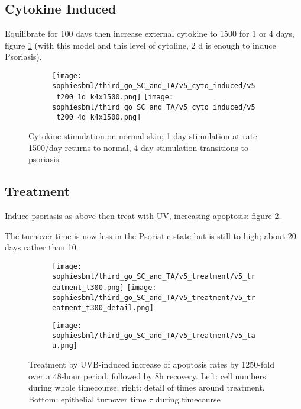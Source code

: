 \documentclass[a4paper,10pt]{report}
\newcommand{\psortbase}{/home/ngrs2/work/bsu/PSORT_Zuliani_Reynolds/}
\newcommand{\sbmlbase}{\psortbase/sbml-sh/}
\newcommand{\sophiesbml}{\sbmlbase/sophie_like}
\begin{document}
\subsection{Cytokine Induced}

Equilibrate for 100 days then increase external cytokine to 1500 for 1 or 4 days, figure \ref{fig:thirdsophie_cytostim} (with this model and this level of cytoline, 2 d is enough to induce Psoriasis). 


\begin{figure}[h!]
  \begin{subfigure}{\textwidth}
    \texttt{[image: \\sophiesbml/third\_go\_SC\_and\_TA/v5\_cyto\_induced/v5\_t200\_1d\_k4x1500.png]}
    \texttt{[image: \\sophiesbml/third\_go\_SC\_and\_TA/v5\_cyto\_induced/v5\_t200\_4d\_k4x1500.png]}
  \end{subfigure}
  \caption{Cytokine stimulation on normal skin; 1 day stimulation at rate 1500/day returns to normal, 4 day stimulation transitions to psoriasis.}
  \label{fig:thirdsophie_cytostim}
\end{figure}



\subsection{Treatment}

Induce psoriasis as above then treat with UV, increasing apoptosis: figure \ref{fig:thirdsophie_treatment}. 

The turnover time is now less in the Psoriatic state but is still to high; about 20 days rather than 10.

\begin{figure}[h!]
  \begin{subfigure}{\textwidth}
    \texttt{[image: \\sophiesbml/third\_go\_SC\_and\_TA/v5\_treatment/v5\_treatment\_t300.png]}
    \texttt{[image: \\sophiesbml/third\_go\_SC\_and\_TA/v5\_treatment/v5\_treatment\_t300\_detail.png]}
  \end{subfigure}
  \begin{subfigure}{\textwidth}
    \texttt{[image: \\sophiesbml/third\_go\_SC\_and\_TA/v5\_treatment/v5\_tau.png]}
  \end{subfigure}
  \caption{Treatment by UVB-induced increase of apoptosis rates by 1250-fold over a 48-hour period, followed by 8h recovery. Left: cell numbers during whole timecourse; right: detail of times around treatment. Bottom: epithelial turnover time $\tau$ during timecourse}
  \label{fig:thirdsophie_treatment}
\end{figure}
\end{document}
